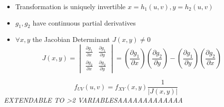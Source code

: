 \begin{itemize}
  \item Transformation is uniquely invertible $x=h_{1}(u,v), y=h_{2}(u,v)$
  \item $g_1,g_2$ have continuous partial derivatives
  \item $\forall x,y$ the Jacobian Determinant $J(x,y)\neq0$
    \[J(x,y)=\begin{vmatrix}\frac{\partial g_1}{\partial x}&\frac{\partial g_1}{\partial y}\\\frac{\partial g_2}{\partial x}&\frac{\partial g_2}{\partial y}\end{vmatrix}=
  (\frac{\partial g_1}{\partial x})(\frac{\partial g_2}{\partial y})-(\frac{\partial g_1}{\partial y})(\frac{\partial g_2}{\partial x})\]
\end{itemize}
\[f_{UV}(u,v)=f_{XY}(x,y)\frac{1}{|J(x,y)|}\]
\emph{EXTENDABLE TO >2 VARIABLESAAAAAAAAAAAAA}
